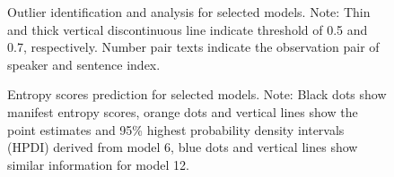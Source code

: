 \documentclass[
]{agujournal2019}
\begin{document}
\label{cell-fig-rq1-model-outliers}
\begin{figure}[H]


\caption{\label{fig-rq1-model-outliers}Outlier identification and
analysis for selected models. Note: Thin and thick vertical
discontinuous line indicate threshold of 0.5 and 0.7, respectively.
Number pair texts indicate the observation pair of speaker and sentence
index.}

\end{figure}%

\label{cell-fig-rq3-pred-speaker}
\begin{figure}[H]


\caption{\label{fig-rq3-pred-speaker}Entropy scores prediction for
selected models. Note: Black dots show manifest entropy scores, orange
dots and vertical lines show the point estimates and 95\% highest
probability density intervals (HPDI) derived from model 6, blue dots and
vertical lines show similar information for model 12.}

\end{figure}%
\end{document}
